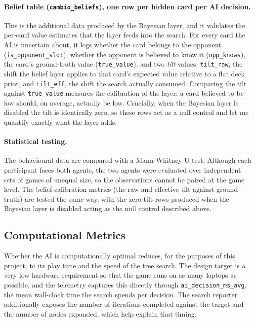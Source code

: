 \documentclass[12pt,a4paper,oneside]{report}
\begin{document}
\paragraph{Belief table (\texttt{cambio\_beliefs}), one row per hidden card per AI
decision.}
This is the additional data produced by the Bayesian layer, and it validates the
per-card value estimates that the layer feeds into the search. For every card the
AI is uncertain about, it logs whether the card belongs to the opponent
(\texttt{is\_opponent\_slot}), whether the opponent is believed to know it
(\texttt{opp\_knows}), the card's ground-truth value (\texttt{true\_value}), and two
\emph{tilt} values: \texttt{tilt\_raw}, the shift the belief layer applies to that
card's expected value relative to a flat deck prior, and \texttt{tilt\_eff}, the
shift the search actually consumed. Comparing the tilt against \texttt{true\_value}
measures the calibration of the layer: a card believed to be low should, on
average, actually be low. Crucially, when the Bayesian layer is disabled the tilt
is identically zero, so these rows act as a null control and let me quantify exactly
what the layer adds.

\paragraph{Statistical testing.}
The behavioural data are compared with a Mann-Whitney U test. Although each participant faces both agents, the two agents were evaluated over independent sets of games of unequal size, so the observations cannot be paired at the game level. The belief-calibration metrics (the raw and effective tilt against ground truth) are tested the same way, with the zero-tilt rows produced when the Bayesian layer is disabled acting as the null control described above.

\subsection{Computational Metrics}
\label{sec:comp-metrics}
Whether the AI is computationally optimal reduces, for the purposes of this project,
to its play time and the speed of the tree search. The design target is a very low
hardware requirement so that the game runs on as many laptops as possible, and the
telemetry captures this directly through \texttt{ai\_decision\_ms\_avg}, the mean
wall-clock time the search spends per decision. The search reporter additionally
exposes the number of iterations completed against the target and the number of
nodes expanded, which help explain that timing.
\end{document}
